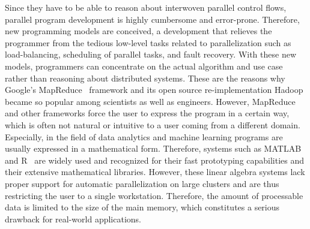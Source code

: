 Since they have to be able to reason about interwoven parallel control flows, parallel program development is highly cumbersome and error-prone.
Therefore, new programming models are conceived, a development that relieves the programmer from the tedious low-level tasks related to parallelization such as load-balancing, scheduling of parallel tasks, and fault recovery.
With these new models, programmers can concentrate on the actual algorithm and use case rather than reasoning about distributed systems. These are the reasons why Google's MapReduce~\cite{dean:c2008a} framework and its open source re-implementation Hadoop~\cite{hadoop:2008a} became so popular among scientists as well as engineers.
However, MapReduce and other frameworks force the user to express the program in a certain way, which is often not natural or intuitive to a user coming from a different domain.
Especially, in the field of data analytics and machine learning programs are usually expressed in a mathematical form.
Therefore, systems such as MATLAB~\cite{matlab} and R~\cite{r:1993a} are widely used and recognized for their fast prototyping capabilities and their extensive mathematical libraries.
However, these linear algebra systems lack proper support for automatic parallelization on large clusters and are thus restricting the user to a single workstation.
Therefore, the amount of processable data is limited to the size of the main memory, which constitutes a serious drawback for real-world applications.

